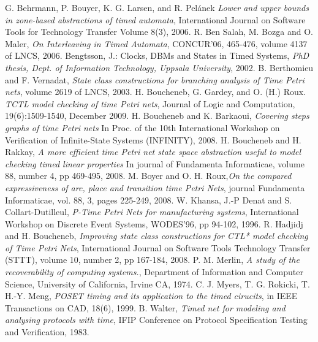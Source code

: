 \documentclass[submission,copyright,creativecommons]{eptcs}
\numberwithin{equation}{section}
\begin{document}
\begin{thebibliography}{10}\label{bibliography}
 G. Behrmann, P. Bouyer, K. G. Larsen, and R. Pel{\'a}nek \emph{Lower and
upper bounds in zone-based abstractions of timed automata},
International Journal on Software Tools for Technology Transfer
Volume 8(3), 2006.
 R. Ben Salah, M. Bozga and O. Maler, \emph{On Interleaving in Timed Automata}, CONCUR'06, 465-476,
volume 4137 of LNCS, 2006.
  Bengtsson, J.: Clocks, DBMs and States in Timed Systems, \emph{PhD
thesis, Dept. of Information Technology, Uppsala University},
2002.
 B. Berthomieu and F. Vernadat, \emph{State class constructions for branching analysis of Time Petri nets},
volume 2619 of LNCS, 2003.
 H. Boucheneb, G. Gardey, and O.
(H.) Roux. \emph{TCTL model checking of time Petri nets}, Journal
of Logic and Computation, 19(6):1509-1540, December 2009.
 H. Boucheneb and K. Barkaoui,
\emph{Covering steps graphs of time Petri nets} In Proc. of the
10th International Workshop on Verification of Infinite-State
Systems (INFINITY), 2008.
 H. Boucheneb and H. Rakkay, \emph{A more efficient time Petri net state space abstraction useful to model checking timed linear
properties} In journal of Fundamenta Informaticae, volume 88,
number 4, pp 469-495, 2008.
 M. Boyer and O. H. Roux,\emph{On the compared expressiveness of arc, place and transition time {Petri} Nets}, journal Fundamenta Informaticae, vol. 88,  3, pages 225-249, 2008.
 W. Khansa,  J.-P Denat and  S. Collart-Dutilleul,
 \emph{P-Time {P}etri Nets for manufacturing systems}, International Workshop on Discrete Event Systems, WODES'96, pp 94-102, 1996.
 R. Hadjidj and H. Boucheneb, \emph{Improving state class constructions for {CTL*} model checking of
Time Petri Nets}, International Journal on Software Tools
Technology Transfer (STTT), volume 10, number 2, pp 167-184, 2008.
 P. M. Merlin, \emph{A study of the recoverability of computing systems.}, Department of Information and Computer Science, University of California, Irvine CA, 1974.
 C. J. Myers, T. G. Rokicki, T. H.-Y. Meng, \emph{POSET timing and its application to the timed cirucits}, in IEEE Transactions on CAD, 18(6), 1999.
 B. Walter, \emph{Timed net for modeling and analysing protocols with time},
IFIP Conference on Protocol Specification Testing and Verification, 1983.
\end{thebibliography}
\end{document}
